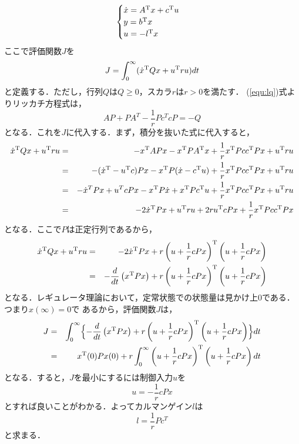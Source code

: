 \documentclass[a4paper,12pt]{jarticle}
\begin{document}
\begin{eqnarray}\label{equ:lq}
 \begin{cases}
  \dot{x} = A^{\rm{T}}x+c^{\rm{T}}u & \\
  y = b^{\rm{T}}x & \\
  u = -l^{\rm{T}}x
 \end{cases}
\end{eqnarray}
ここで評価関数$J$を
\begin{equation}
 J  = \int_0^\infty (\dot{x}^{\rm{T}} Q x + u^{\rm{T}}ru) dt
\end{equation}
と定義する．ただし，行列$Q$は$Q \geq 0$，スカラ$r$は$r>0$を満たす．
(\ref{equ:lq})式よりリッカチ方程式は，
\begin{equation}
 AP + PA^T -\frac{1}{r}Pc^TcP = -Q 
\end{equation}
となる．これを$J$に代入する．まず，積分を抜いた式に代入すると，
\begin{eqnarray}
 \dot{x}^{\rm{T}} Q x + u^{\rm{T}} ru & = & -x^{\rm{T}}APx-x^{\rm{T}}PA^{\rm{T}}x+\frac{1}{r}x^{\rm{T}}Pcc^{\rm{T}}Px+u^{\rm{T}}ru \\
 & = & -(\dot{x}^{\rm{T}} -
  u^{\rm{T}}c)Px-x^{\rm{T}}P(\dot{x}-c^{\rm{T}}u)+\frac{1}{r}x^{\rm{T}}Pcc^{\rm{T}}Px+u^{\rm{T}}ru \\
 & = & -\dot{x}^T Px + u^T cPx -x^{\rm{T}}P\dot{x} + x^{\rm{T}}
  Pc^{\rm{T}}u + \frac{1}{r}x^{\rm{T}}Pcc^{\rm{T}}Px+u^{\rm{T}}ru \\
 & = & -2 \dot{x}^{\rm{T}}Px + u^{\rm{T}}ru + 2ru^{\rm{T}}cPx + \frac{1}{r}x^{\rm{T}}Pcc^{\rm{T}}Px
\end{eqnarray}
となる．ここで$P$は正定行列であるから，
\begin{eqnarray}
 \dot{x}^{\rm{T}} Q x + u^{\rm{T}} ru & = &  -2 \dot{x}^{\rm{T}}Px +
  r \left(u+\frac{1}{r}cPx \right)^{\rm{T}} \left(u+\frac{1}{r}cPx \right) \\
 & = & - \frac{d}{dt} \left(x^{\rm{T}} Px \right)+ r \left(u+\frac{1}{r}cPx \right)^{\rm{T}} \left(u+\frac{1}{r}cPx \right)
\end{eqnarray}
となる．レギュレータ理論において，定常状態での状態量は見かけ上$0$である．つまり$x(\infty)=0$で
あるから，評価関数$J$は，
\begin{eqnarray}
 J & = & \int_0^\infty  \Bigl\{ -\frac{d}{dt} \left(x^{\rm{T}}Px \right) +  r \left(u+\frac{1}{r}cPx \right)^{\rm{T}}
  \left(u+\frac{1}{r}cPx \right) \Bigr\} dt\\
 & = &  x^{\rm{T}}(0)Px(0)  + r \int_0^\infty \left(u+\frac{1}{r}cPx \right)^{\rm{T}}
  \left(u+\frac{1}{r}cPx \right)  dt
\end{eqnarray}
となる．すると，$J$を最小にするには制御入力$u$を
\begin{equation}
 u = - \frac{1}{r}cPx
\end{equation}
とすれば良いことがわかる．よってカルマンゲイン$l$は
\begin{equation}
 l = \frac{1}{r}Pc^T
\end{equation}
と求まる．
\end{document}
